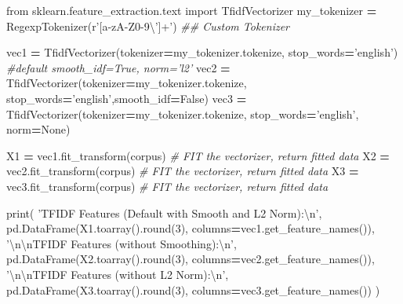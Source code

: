 \documentclass[
]{book}
\newenvironment{Shaded}{\begin{snugshade}}{\end{snugshade}}
\newcommand{\BuiltInTok}[1]{#1}
\newcommand{\CharTok}[1]{\textcolor[rgb]{0.5,0.5,0.5}{#1}}
\newcommand{\CommentTok}[1]{\textcolor[rgb]{0.37,0.37,0.37}{\textit{#1}}}
\newcommand{\DecValTok}[1]{\textcolor[rgb]{0.06,0.06,0.06}{#1}}
\newcommand{\ImportTok}[1]{#1}
\newcommand{\NormalTok}[1]{#1}
\newcommand{\OperatorTok}[1]{\textcolor[rgb]{0.43,0.43,0.43}{\textbf{#1}}}
\newcommand{\StringTok}[1]{\textcolor[rgb]{0.5,0.5,0.5}{#1}}
\newcommand{\VariableTok}[1]{\textcolor[rgb]{0,0,0}{#1}}
\newcommand{\VerbatimStringTok}[1]{\textcolor[rgb]{0.5,0.5,0.5}{#1}}
\begin{document}
\begin{Shaded}
\begin{Highlighting}[]
\ImportTok{from}\NormalTok{ sklearn.feature_extraction.text }\ImportTok{import}\NormalTok{ TfidfVectorizer}
\NormalTok{my_tokenizer }\OperatorTok{=}\NormalTok{ RegexpTokenizer(}\VerbatimStringTok{r'[a-zA-Z0-9\textbackslash{}']+'}\NormalTok{)  }\CommentTok{## Custom Tokenizer}

\NormalTok{vec1 }\OperatorTok{=}\NormalTok{ TfidfVectorizer(tokenizer}\OperatorTok{=}\NormalTok{my_tokenizer.tokenize,  stop_words}\OperatorTok{=}\StringTok{'english'}\NormalTok{) }\CommentTok{#default smooth_idf=True, norm='l2'}
\NormalTok{vec2 }\OperatorTok{=}\NormalTok{ TfidfVectorizer(tokenizer}\OperatorTok{=}\NormalTok{my_tokenizer.tokenize, stop_words}\OperatorTok{=}\StringTok{'english'}\NormalTok{,smooth_idf}\OperatorTok{=}\VariableTok{False}\NormalTok{)}
\NormalTok{vec3 }\OperatorTok{=}\NormalTok{ TfidfVectorizer(tokenizer}\OperatorTok{=}\NormalTok{my_tokenizer.tokenize, stop_words}\OperatorTok{=}\StringTok{'english'}\NormalTok{, norm}\OperatorTok{=}\VariableTok{None}\NormalTok{)}

\NormalTok{X1   }\OperatorTok{=}\NormalTok{ vec1.fit_transform(corpus)  }\CommentTok{# FIT the vectorizer, return fitted data}
\NormalTok{X2   }\OperatorTok{=}\NormalTok{ vec2.fit_transform(corpus)  }\CommentTok{# FIT the vectorizer, return fitted data}
\NormalTok{X3   }\OperatorTok{=}\NormalTok{ vec3.fit_transform(corpus)  }\CommentTok{# FIT the vectorizer, return fitted data}

\BuiltInTok{print}\NormalTok{(}
  \StringTok{'TFIDF Features (Default with Smooth and L2 Norm):}\CharTok{\textbackslash{}n}\StringTok{'}\NormalTok{,}
\NormalTok{  pd.DataFrame(X1.toarray().}\BuiltInTok{round}\NormalTok{(}\DecValTok{3}\NormalTok{), columns}\OperatorTok{=}\NormalTok{vec1.get_feature_names()),}
  \StringTok{'}\CharTok{\textbackslash{}n\textbackslash{}n}\StringTok{TFIDF Features (without Smoothing):}\CharTok{\textbackslash{}n}\StringTok{'}\NormalTok{,}
\NormalTok{  pd.DataFrame(X2.toarray().}\BuiltInTok{round}\NormalTok{(}\DecValTok{3}\NormalTok{), columns}\OperatorTok{=}\NormalTok{vec2.get_feature_names()),}
  \StringTok{'}\CharTok{\textbackslash{}n\textbackslash{}n}\StringTok{TFIDF Features (without L2 Norm):}\CharTok{\textbackslash{}n}\StringTok{'}\NormalTok{,}
\NormalTok{  pd.DataFrame(X3.toarray().}\BuiltInTok{round}\NormalTok{(}\DecValTok{3}\NormalTok{), columns}\OperatorTok{=}\NormalTok{vec3.get_feature_names())}
\NormalTok{  )}
\end{Highlighting}
\end{Shaded}
\end{document}
